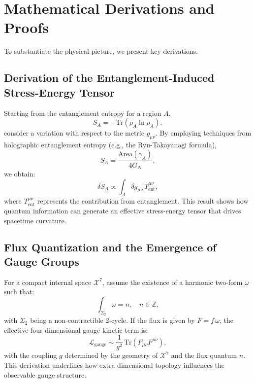 \documentclass[12pt, a4paper]{article}
\begin{document}
\section{Mathematical Derivations and Proofs}
To substantiate the physical picture, we present key derivations.

\subsection{Derivation of the Entanglement-Induced Stress-Energy Tensor}
Starting from the entanglement entropy for a region \(A\),
\begin{equation}
    S_A = -\text{Tr}(\rho_A \ln \rho_A),
\end{equation}
consider a variation with respect to the metric \(g_{\mu\nu}\). By employing techniques from holographic entanglement entropy (e.g., the Ryu-Takayanagi formula),
\begin{equation}
    S_A = \frac{\text{Area}(\gamma_A)}{4G_N},
\end{equation}
we obtain:
\begin{equation}
    \delta S_A \propto \int_A \delta g_{\mu\nu}\, T^{\mu\nu}_{\text{ent}},
\end{equation}
where \(T^{\mu\nu}_{\text{ent}}\) represents the contribution from entanglement. This result shows how quantum information can generate an effective stress-energy tensor that drives spacetime curvature.

\subsection{Flux Quantization and the Emergence of Gauge Groups}
For a compact internal space \(\mathcal{X}^7\), assume the existence of a harmonic two-form \(\omega\) such that:
\begin{equation}
    \int_{\Sigma_2} \omega = n, \quad n \in \mathbb{Z},
\end{equation}
with \(\Sigma_2\) being a non-contractible 2-cycle. If the flux is given by \(F = f\,\omega\), the effective four-dimensional gauge kinetic term is:
\begin{equation}
    \mathcal{L}_{\text{gauge}} \sim \frac{1}{g^2} \, \text{Tr}(F_{\mu\nu} F^{\mu\nu}),
\end{equation}
with the coupling \(g\) determined by the geometry of \(\mathcal{X}^7\) and the flux quantum \(n\). This derivation underlines how extra-dimensional topology influences the observable gauge structure.
\end{document}
